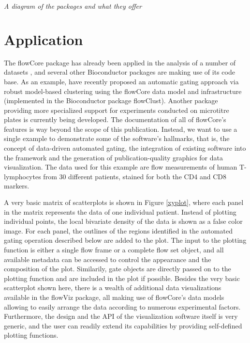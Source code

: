 \documentclass[12pt]{article}
\begin{document}
\textit{A diagram of the packages and what they offer}

\section*{Application}
The flowCore package has already been applied in the analysis of a
number of datasets \citep{gasparetto2004ice,brinkman2007hcf}, and
several other Bioconductor packages are making use of its code
base. As an example, \cite{lo2008agf} have recently proposed an
automatic gating approach via robust model-based clustering using the
flowCore data model and infrastructure (implemented in the
Bioconductor package flowClust). Another package providing more
specialized support for experiments conducted on microtitre plates is
currently being developed. The documentation of all of flowCore's
features is way beyond the scope of this publication. Instead, we
want to use a single example to demonstrate some of the software's
hallmarks, that is, the concept of data-driven automated gating, the
integration of existing software into the framework and the generation
of publication-quality graphics for data visualization. The data used
for this example are flow measurements of human T-lymphocytes from 30
different patients, stained for both the CD4 and CD8 markers.

A very basic matrix of scatterplots is shown in Figure \ref{xyplot},
where each panel in the matrix represents the data of one individual
patient. Instead of plotting individual points, the local bivariate
density of the data is shown as a false color image. For each panel,
the outlines of the regions identified in the automated gating
operation described below are added to the plot. The input to the
plotting function is either a single flow frame or a complete flow set
object, and all available metadata can be accessed to control the
appearance and the composition of the plot. Similarily, gate objects
are directly passed on to the plotting function and are included in
the plot if possible. Besides the very basic scatterplot shown here,
there is a wealth of additional data visualizations available in the
flowViz package\cite{sarkar2008ufv}, all making use of flowCore's data
models allowing to easily arrange the data according to numerous
experimental factors. Furthermore, the design and the API of the
visualization software itself is very generic, and the user can
readily extend its capabilities by providing self-defined plotting
functions.
\end{document}
